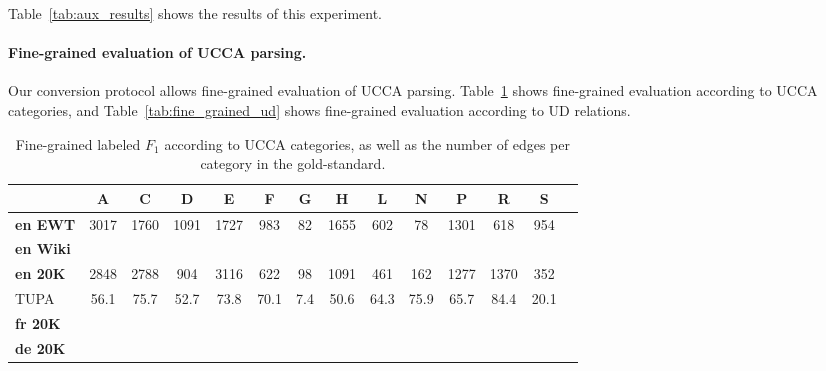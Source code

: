 \documentclass[11pt,a4paper]{article}
\begin{document}
Table~\ref{tab:aux_results} shows the results of this experiment.


\paragraph{Fine-grained evaluation of UCCA parsing.}

Our conversion protocol allows fine-grained evaluation of UCCA parsing.
Table~\ref{tab:fine_grained_ucca} shows fine-grained evaluation according to UCCA categories, and
Table~\ref{tab:fine_grained_ud} shows fine-grained evaluation according to UD relations.


\begin{table}[t]
\centering
\tiny
\setlength\tabcolsep{2pt}
\begin{tabular}{l|ccccccccccccc}
& A & C & D & E & F & G & H & L & N & P & R & S \\
\hline
\textbf{en EWT} & 3017 & 1760 & 1091 & 1727 & 983 & 82 & 1655 & 602 & 78 & 1301 & 618 & 954 \\
\hline
\textbf{en Wiki} &  \\
\hline
\textbf{en 20K} & 2848 & 2788 & 904 & 3116 & 622 & 98 & 1091 & 461 & 162 & 1277 & 1370 & 352 \\
TUPA & 56.1 & 75.7 & 52.7 & 73.8 & 70.1 & 7.4 & 50.6 & 64.3 & 75.9 & 65.7 & 84.4 & 20.1 \\
\hline
\textbf{fr 20K} & \\
\hline
\textbf{de 20K} & 
\end{tabular}
\caption{
Fine-grained labeled $F_1$ according to UCCA categories,
as well as the number of edges per category in the gold-standard.}
\label{tab:fine_grained_ucca}
\end{table}

\begin{table*}[t]
\centering
\tiny
\setlength\tabcolsep{2pt}
\begin{tabular}{l|ccccccccccccccccccccccccccccccc}
&  \\
\hline
\end{tabular}
\caption{
Fine-grained labeled $F_1$ according to gold UD relations (for EWT)
or as parsed by UDPipe (for the other datasets),
as well as the number of arcs per relation in UD,
and the number of matched UCCA units in the gold-standard UCCA.
Some relations omitted for brevity.}
\label{tab:fine_grained_ud}
\end{table*}



\end{document}

